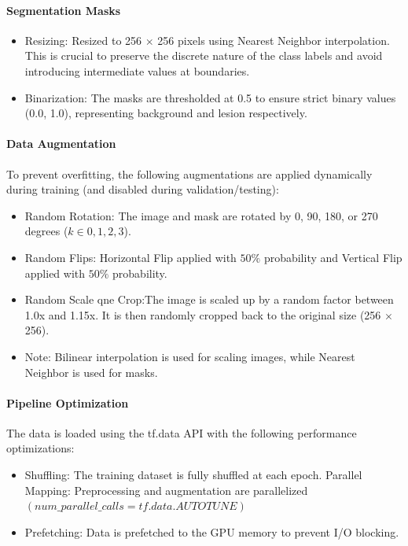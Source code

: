 \paragraph{Segmentation Masks}

\begin{itemize}
    \item Resizing: Resized to 256 $\times$ 256 pixels using Nearest Neighbor interpolation. This is crucial to preserve the discrete nature of the class labels and avoid introducing intermediate values at boundaries.
    \item Binarization: The masks are thresholded at 0.5 to ensure strict binary values ({0.0, 1.0}), representing background and lesion respectively. 
\end{itemize}

\paragraph{Data Augmentation}

To prevent overfitting, the following augmentations are applied dynamically during training (and disabled during validation/testing):

\begin{itemize}
    \item Random Rotation: The image and mask are rotated by 0, 90, 180, or 270 degrees ($k \in {0, 1, 2, 3}$).
    \item Random Flips: Horizontal Flip applied with $50\%$ probability and Vertical Flip applied with $50\%$ probability.
    \item Random Scale qne Crop:The image is scaled up by a random factor between 1.0x and 1.15x. It is then randomly cropped back to the original size (256 $\times$ 256).
    \item Note: Bilinear interpolation is used for scaling images, while Nearest Neighbor is used for masks.
\end{itemize}

\paragraph{Pipeline Optimization}

The data is loaded using the tf.data API with the following performance optimizations:
\begin{itemize}
    \item Shuffling: The training dataset is fully shuffled at each epoch.
    Parallel Mapping: Preprocessing and augmentation are parallelized $(num\_parallel\_calls=tf.data.AUTOTUNE)$
    \item Prefetching: Data is prefetched to the GPU memory to prevent I/O blocking.
\end{itemize}



